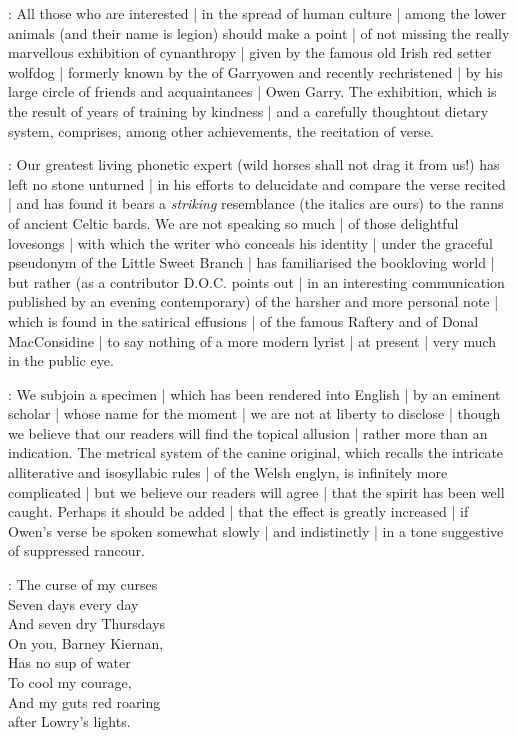 :
All those who are interested |
in the spread of human culture |
among the lower animals
(and their name is legion)
should make a point |
of not missing the really marvellous exhibition of cynanthropy |
given by the famous old Irish red setter wolfdog |
formerly known by the  of Garryowen
and recently rechristened |
by his large circle of friends and acquaintances |
Owen Garry.
The exhibition,
which is the result
of years of training by kindness |
and a carefully thoughtout dietary system,
comprises,
among other achievements,
the recitation of verse.

:
Our greatest living phonetic expert
(wild horses shall not drag it from us!)
has left no stone unturned |
in his efforts to delucidate and compare the verse recited |
and has found it bears a \emph{striking} resemblance
(the italics are ours)
to the ranns of ancient Celtic bards.
We are not speaking so much |
of those delightful lovesongs |
with which the writer who conceals his identity |
under the graceful pseudonym of the Little Sweet Branch |
has familiarised the bookloving world |
but rather
(as a contributor D.O.C. points out |
in an interesting communication published by an evening contemporary)
of the harsher and more personal note |
which is found in the satirical effusions |
of the famous Raftery
and of Donal MacConsidine |
to say nothing of a more modern lyrist |
at present |
very much in the public eye.%

:
We subjoin a specimen |
which has been rendered into English |
by an eminent scholar |
whose name for the moment |
we are not at liberty to disclose |
though we believe that our readers will find the topical allusion |
rather more than an indication.
The metrical system of the canine original,
which recalls the intricate alliterative and isosyllabic rules |
of the Welsh englyn,
is infinitely more complicated |
but we believe our readers will agree |
that the spirit has been well caught.
Perhaps it should be added |
that the effect is greatly increased |
if Owen's verse be spoken somewhat slowly |
and indistinctly |
in a tone suggestive of suppressed rancour.

\garryowen:
    The curse
       of my curses\\
    Seven days every day\\
    And seven dry Thursdays\\
    On you, Barney Kiernan,\\
    Has no sup of water\\
    To cool my courage,\\
    And my guts red roaring\\
    after Lowry's lights.

